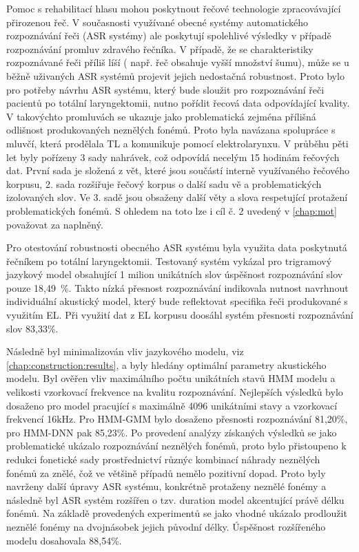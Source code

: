 Pomoc s rehabilitací hlasu mohou poskytnout řečové technologie zpracovávající přirozenou řeč. V současnosti využívané obecné systémy automatického rozpoznávání řeči (ASR systémy) ale poskytují spolehlivé výsledky v případě rozpoznávání promluv zdravého řečníka. V případě, že se charakteristiky rozpoznávané řeči příliš líší ( např. řeč obsahuje vyšší množství šumu), může se u běžně uživaných ASR systémů projevit jejich nedostačná robustnost. Proto bylo pro potřeby návrhu ASR systému, který bude sloužit pro rozpoznávání řeči pacientů po totální laryngektomii, nutno pořídit řecová data odpovídající kvality. V takovýchto promluvách se ukazuje jako problematická zejména přílišná odlišnost produkovaných neznělých fonémů. Proto byla navázana spolupráce s mluvčí, která prodělala TL a komunikuje pomocí elektrolarynxu. V průběhu pěti let byly pořízeny 3 sady nahrávek, což odpovídá necelým 15 hodinám řečových dat. První sada je složená z vět, které jsou součástí interně využívaného řečového korpusu, 2. sada rozšiřuje řečový korpus o další sadu vě a problematických izolovaných slov. Ve 3. sadě jsou obsaženy další věty a slova respetující protažení problematických fonémů.
S ohledem na toto lze i cíl č. 2 uvedený v \ref{chap:mot} považovat za naplněný.

Pro otestování robustnosti obecného ASR systému byla využita data poskytnutá řečníkem po totální laryngektomii. Testovaný systém vykázal pro trigramový jazykový model obsahující 1 milion unikátních slov úspěšnost rozpoznávání slov pouze 18,49~\%. Takto nízká přesnost rozpoznávání indikovala nutnost navrhnout individuální akustický model, který bude reflektovat specifika řeči produkované s využitím EL. Při využití dat z EL korpusu doosáhl systém přesnosti rozpoznávání slov 83,33\%. 

Následně byl minimalizován vliv jazykového modelu, viz \ref{chap:construction:results}, a byly hledány optimální parametry akustického modelu. Byl ověřen vliv maximálního počtu unikátních stavů HMM modelu a velikosti vzorkovací frekvence na kvalitu rozpoznávání. Nejlepších výsledků bylo dosaženo pro model pracující s maximálně 4096 unikátními stavy a vzorkovací frekvencí 16kHz. Pro HMM-GMM bylo dosaženo přesnosti rozpoznávání 81,20\%, pro HMM-DNN pak 85,23\%. Po provedení analýzy získaných výsledků se jako problematické ukázalo rozpoznávání neznělých fonémů, proto bylo přistoupeno k redukci fonetické sady prostřednictví různýc kombinací náhrady neznělých fonémů za znělé, čož ve většině případů nemělo pozitivní dopad. Proto byly navrženy další úpravy ASR systému, konkrétně protaženy neznělé fonémy a následně byl ASR systém rozšířen o tzv. duration model akcentující právě délku fonémů. Na základě provedených experimentů se jako vhodné ukázalo prodloužit neznělé fonémy na dvojnásobek jejich původní délky. Úspěšnost rozšířeného modelu dosahovala 88,54\%.

